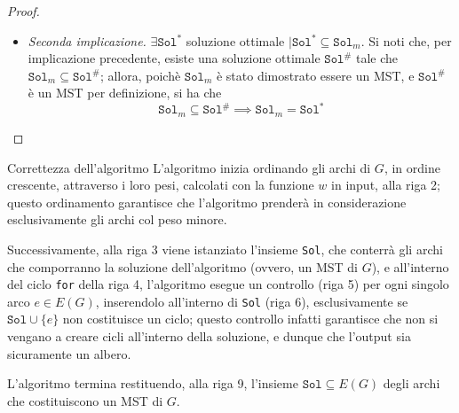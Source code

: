 \documentclass[a4paper, 12pt]{report}
\begin{document}
\begin{proof}
\begin{itemize}
\begin{itemize}
                    \item si noti che, considerando l'insieme di archi $(\texttt{Sol}^* \cup \{e_{k +1}\}) - \{e_j\}$, il vertice $y$ resta coperto
                    \item si noti che l'arco $e_j$ non è in $\texttt{Sol}_{k +1}$, e dunque $k + 1 < j$; allora, per via dell'ordinamento degli archi alla riga $2$, necessariamente $w(e_{k +1}) \le w(e_j)$; dunque, si ha che $$\displaystyle \sum_{e \in ((\texttt{Sol}^* \cup \{e_{k +1}\}) - \{e_j\})}{w(e)} \le \sum_{e \in \texttt{Sol}^*}{w(e)}$$ ma poiché $\texttt{Sol}^*$, per definizione, è soluzione ottimale, non è possibile trovare una soluzione con peso inferiore, e dunque necessariamente $$(\texttt{Sol}^* \cup \{e_{k +1}\}) - \{e_j\}$$ ha lo stesso peso di $\texttt{Sol}^*$, che costituisce un MST di $G$; allora, tale insieme di archi è una soluzione ottimale, contenente $\texttt{Sol}_{k +1}$ per definizione.
                \end{itemize}
            \item[] \textit{Seconda implicazione.} $\exists \texttt{Sol}^*$ soluzione ottimale $\mid \texttt{Sol}^* \subseteq \texttt{Sol}_m$. Si noti che, per implicazione precedente, esiste una soluzione ottimale $\texttt{Sol}^\#$ tale che $\texttt{Sol}_m \subseteq \texttt{Sol}^\#$; allora, poichè $\texttt{Sol}_m$ è stato dimostrato essere un MST, e $\texttt{Sol}^\#$ è un MST per definizione, si ha che $$\texttt{Sol}_m \subseteq \texttt{Sol}^\# \implies \texttt{Sol}_m = \texttt{Sol}^*$$
        \end{itemize}
    \end{proof}

    \begin{framedobs}{Correttezza dell'algoritmo}
        L'algoritmo inizia ordinando gli archi di $G$, in ordine crescente, attraverso i loro pesi, calcolati con la funzione $w$ in input, alla riga 2; questo ordinamento garantisce che l'algoritmo prenderà in considerazione esclusivamente gli archi col peso minore.

        Successivamente, alla riga 3 viene istanziato l'insieme \texttt{Sol}, che conterrà gli archi che comporranno la soluzione dell'algoritmo (ovvero, un MST di $G$), e all'interno del ciclo \texttt{for} della riga 4, l'algoritmo esegue un controllo (riga 5) per ogni singolo arco $e \in E(G)$, inserendolo all'interno di \texttt{Sol} (riga 6), esclusivamente se $\texttt{Sol} \cup \{e\}$ non costituisce un ciclo; questo controllo infatti garantisce che non si vengano a creare cicli all'interno della soluzione, e dunque che l'output sia sicuramente un albero.

        L'algoritmo termina restituendo, alla riga 9, l'insieme $\texttt{Sol} \subseteq E(G)$ degli archi che costituiscono un MST di $G$.
    \end{framedobs}
\end{document}
